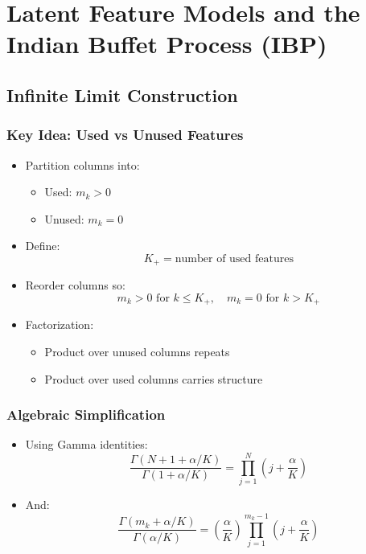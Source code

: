 \documentclass[12pt,oneside]{book}
\numberwithin{equation}{section}
\theoremstyle{definition}
\theoremstyle{plain}
\theoremstyle{remark}
\begin{document}
\chapter{Latent Feature Models and the Indian Buffet Process (IBP)}

\section{Infinite Limit Construction}

\subsection*{Key Idea: Used vs Unused Features}

\begin{itemize}
\item Partition columns into:
\begin{itemize}
\item Used: $m_k > 0$
\item Unused: $m_k = 0$
\end{itemize}

\item Define:
\[
K_+ = \text{number of used features}
\]

\item Reorder columns so:
\[
m_k > 0 \text{ for } k \le K_+, \quad m_k = 0 \text{ for } k > K_+
\]

\item Factorization:
\begin{itemize}
\item Product over unused columns repeats
\item Product over used columns carries structure
\end{itemize}
\end{itemize}

\subsection*{Algebraic Simplification}

\begin{itemize}
\item Using Gamma identities:
\[
\frac{\Gamma(N+1+\alpha/K)}{\Gamma(1+\alpha/K)}
=
\prod_{j=1}^N \left(j + \frac{\alpha}{K}\right)
\]

\item And:
\[
\frac{\Gamma(m_k+\alpha/K)}{\Gamma(\alpha/K)}
=
\left(\frac{\alpha}{K}\right)\prod_{j=1}^{m_k-1}\left(j+\frac{\alpha}{K}\right)
\]
\end{itemize}
\end{document}
